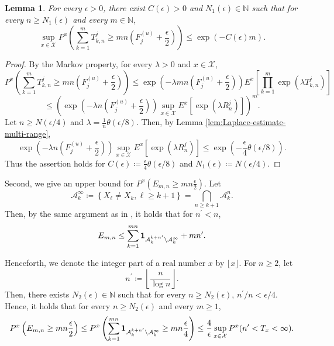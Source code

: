 \documentclass[10pt,a4paper]{amsart}
\newtheorem{Lem}[Thm]{Lemma}
\begin{document}
\begin{Lem}\label{lem:upper-Markov-tail}
For every $\epsilon > 0$, there exist $C(\epsilon) > 0$  and $N_1 (\epsilon) \in \mathbb{N}$ such that 
for every $n \ge N_1 (\epsilon)$ and every $m \in \mathbb{N}$, 
\begin{equation*}\label{eq:multi-range-tail}
\sup_{x \in \mathcal{X}} P^x \left(  \sum_{k=1}^{m}   T^{j}_{k,n} \ge mn \left(F_j^{(u)} + \frac{\epsilon}{2} \right) \right)  \le \exp\left(-C(\epsilon) m \right). 
\end{equation*}
\end{Lem}

\begin{proof}
By the Markov property, for every $\lambda > 0$ and $x \in \mathcal{X}$, 
\[  P^x \left(  \sum_{k=1}^{m}   T^{j}_{k,n} \ge mn \left(F_j^{(u)} + \frac{\epsilon}{2} \right) \right) \le \exp\left(-\lambda mn \left(F_j^{(u)} + \frac{\epsilon}{2} \right) \right) E^x \left[ \prod_{k=1}^{m} \exp\left( \lambda T^{j}_{k,n}  \right)  \right] \]
\[ \le \left( \exp\left(-\lambda n \left(F_j^{(u)} + \frac{\epsilon}{2} \right) \right) \sup_{x \in \mathcal{X}} E^x \left[ \exp(\lambda R^j_n) \right] \right)^m. \]
Let $n \ge N(\epsilon/4)$ and $\lambda = \frac{1}{n} \theta(\epsilon/8)$. 
Then, by Lemma \ref{lem:Laplace-estimate-multi-range}, 
\[  \exp\left(-\lambda n \left(F_j^{(u)} + \frac{\epsilon}{2} \right) \right) \sup_{x \in \mathcal{X}} E^x \left[ \exp(\lambda R^j_n) \right] \le \exp\left(- \frac{\epsilon}{4} \theta(\epsilon/8)\right). \]
Thus the assertion holds for $\displaystyle C(\epsilon) \coloneqq \frac{\epsilon}{4} \theta(\epsilon/8)$ and $N_1 (\epsilon) \coloneqq N(\epsilon/4)$.
\end{proof}

Second, we give an upper bound for  $\displaystyle P^x \left( E_{m,n} \ge mn \frac{\epsilon}{2} \right)$. 
Let 
\[ \mathcal{A}_{k}^{\infty} \coloneqq \left\{X_{\ell} \ne X_k,  \ell \ge k+1 \right\} = \bigcap_{n \ge k+1} \mathcal{A}_{k}^n.\]  
Then, by the same argument as in \cite[Proof of Lemma]{Pitt1974}, 
it holds that for $n^{\prime} < n$, 
\[ E_{m,n} \le \sum_{k=1}^{mn} {\bf 1}_{\mathcal{A}_{k}^{k+n^{\prime}} \setminus \mathcal{A}_{k}^{\infty}} + mn^{\prime}. \]

Henceforth, we denote the integer part of a real number $x$ by $\lfloor x \rfloor$. 
For $n \ge 2$, let 
\begin{equation}\label{eq:def-n-prime}
n^{\prime} \coloneqq \left\lfloor \frac{n}{\log n} \right\rfloor. 
\end{equation}
Then, there exists $N_2 (\epsilon) \in \mathbb{N}$ such that for every $n \ge N_2 (\epsilon)$, $n^{\prime}/n < \epsilon/4$. 
Hence, it holds that for every $n \ge N_2 (\epsilon)$ and every $m \ge 1$, 
\begin{equation}\label{eq:Emn-upper} 
P^x \left( E_{m,n} \ge mn \frac{\epsilon}{2} \right) \le P^x \left(  \sum_{k=1}^{mn} {\bf 1}_{\mathcal{A}_{k}^{k+n^{\prime}} \setminus \mathcal{A}_{k}^{\infty}} \ge mn \frac{\epsilon}{4} \right) \le \frac{4}{\epsilon} \sup_{x \in \mathcal{X}} P^x (n^{\prime} < T_x < \infty). 
\end{equation}
\end{document}
